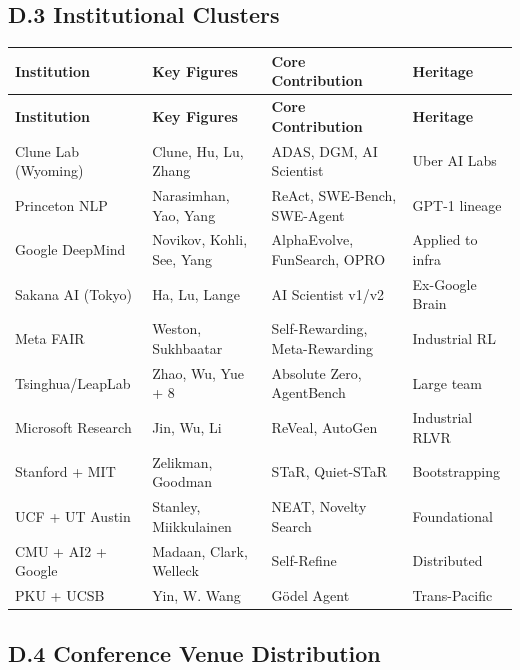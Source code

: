 \subsection*{D.3 Institutional Clusters}

\begin{longtable}{p{30mm}p{28mm}p{30mm}p{18mm}}
\toprule
\textbf{Institution} & \textbf{Key Figures} & \textbf{Core Contribution} & \textbf{Heritage} \\
\midrule
\endfirsthead
\toprule
\textbf{Institution} & \textbf{Key Figures} & \textbf{Core Contribution} & \textbf{Heritage} \\
\midrule
\endhead

Clune Lab (Wyoming) & Clune, Hu, Lu, Zhang & ADAS, DGM, AI Scientist & Uber AI Labs \\
Princeton NLP & Narasimhan, Yao, Yang & ReAct, SWE-Bench, SWE-Agent & GPT-1 lineage \\
Google DeepMind & Novikov, Kohli, See, Yang & AlphaEvolve, FunSearch, OPRO & Applied to infra \\
Sakana AI (Tokyo) & Ha, Lu, Lange & AI Scientist v1/v2 & Ex-Google Brain \\
Meta FAIR & Weston, Sukhbaatar & Self-Rewarding, Meta-Rewarding & Industrial RL \\
Tsinghua/LeapLab & Zhao, Wu, Yue + 8 & Absolute Zero, AgentBench & Large team \\
Microsoft Research & Jin, Wu, Li & ReVeal, AutoGen & Industrial RLVR \\
Stanford + MIT & Zelikman, Goodman & STaR, Quiet-STaR & Bootstrapping \\
UCF + UT Austin & Stanley, Miikkulainen & NEAT, Novelty Search & Foundational \\
CMU + AI2 + Google & Madaan, Clark, Welleck & Self-Refine & Distributed \\
PKU + UCSB & Yin, W. Wang & G\"{o}del Agent & Trans-Pacific \\
\bottomrule
\end{longtable}


\subsection*{D.4 Conference Venue Distribution}

